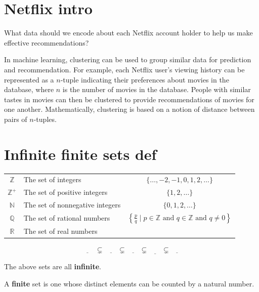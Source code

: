 \documentclass[12pt, oneside]{article}
\begin{document}
\begin{flushright}
\end{flushright} \section*{Netflix intro}


What data should we encode about each Netflix account holder to help us make effective recommendations?

\vfill

In machine learning, clustering can be used to group similar data for prediction and recommendation.  For example,
each Netflix user's viewing history can be represented as a $n$-tuple indicating their preferences about
movies in the database, where $n$ is the number of movies in the database.  People with similar tastes in movies can then be clustered to provide recommendations
of movies for one another.  Mathematically, clustering is based on a notion of distance between pairs of $n$-tuples.

\vfill
 \vfill
\section*{Infinite finite sets def}


\begin{tabular}{clc}
    $\mathbb{Z}$ &  The  set of integers  & $\{ \ldots, -2, -1, 0,  1, 2, \ldots\}$ \\
    $\mathbb{Z}^+$ &  The  set of positive integers  & $\{1, 2, \ldots\}$ \\
    $\mathbb{N}$ &  The  set of nonnegative integers  & $\{0, 1, 2, \ldots\}$ \\
    $\mathbb{Q}$ &  The  set of rational numbers  & $\left\{ \frac{p}{q} \mid p \in \mathbb{Z}  \text{ and  } q  \in \mathbb{Z} \text{ and } q \neq  0 \right\}$\\
    $\mathbb{R}$ & The  set  of  real numbers &  \\
    \end{tabular}
    \[
    \underline{\phantom{\mathbb{Z}^+}} ~~\subsetneq~~ \underline{\phantom{\mathbb{N}~}} ~~\subsetneq ~~\underline{\phantom{\mathbb{Z}~}}~~ \subsetneq~~ \underline{\phantom{\mathbb{Q}~}} 
    ~~\subsetneq~~ \underline{\phantom{\mathbb{R}~}} 
    \]
    
    
    The above sets are all {\bf infinite}.
    
    
    A {\bf finite} set is one whose distinct elements can be counted by a natural number.
    
\end{document}
